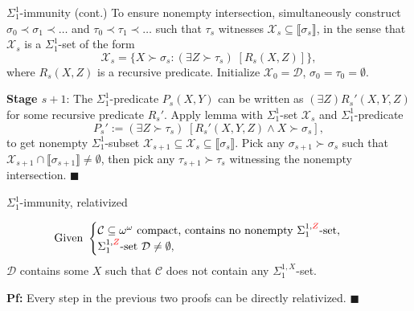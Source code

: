 \begin{frame}{$\Sigma_1^{1}$-immunity (cont.)}
  To ensure nonempty intersection, simultaneously construct
  $\sigma_0\prec\sigma_1\prec\ldots$ and $\tau_0\prec\tau_1\prec\ldots$
  such that $\tau_s$ witnesses $\mathcal{X}_s \subseteq
  \llbracket\sigma_s\rrbracket$, in the sense that $\mathcal{X}_s$ is a
  $\Sigma^1_1$-set of the form
  \[\mathcal{X}_s =\{X\succ\sigma_s: (\exists Z\succ\tau_s)\;
  [R_s(X,Z)]\},\]
  where $R_s(X,Z)$ is a recursive predicate. Initialize
  $\mathcal{X}_0=\mathcal{D}$, $\sigma_0=\tau_0=\emptyset$.

  \vspace{0.5em}
  \textbf{Stage $s+1$}: The $\Sigma^1_1$-predicate $P_s(X,Y)$ can be
  written as $(\exists Z) R_s'(X,Y,Z)$ for some recursive predicate $R_s'$.
  Apply lemma with $\Sigma^1_1$-set $\mathcal{X}_s$ and
  $\Sigma^1_1$-predicate 
  \[P_s' :=(\exists Z\succ\tau_s)\; [R_s'(X,Y,Z) \wedge X\succ\sigma_s],\]
  to get nonempty $\Sigma^1_1$-subset $\mathcal{X}_{s+1} \subseteq
  \mathcal{X}_s \subseteq \llbracket\sigma_s\rrbracket$. Pick any
  $\sigma_{s+1}\succ\sigma_s$ such that $\mathcal{X}_{s+1}\cap
  \llbracket\sigma_{s+1}\rrbracket \neq\emptyset$, then pick any
  $\tau_{s+1}\succ\tau_s$ witnessing the nonempty intersection.
  $\blacksquare$
\end{frame}

\begin{frame}{$\Sigma_1^{1}$-immunity, relativized}
  \begin{coro*}
    \begin{align*}
      \text{Given } &\begin{cases}
        \mathcal{C}\subseteq\omega^\omega \text{ compact, contains
        no nonempty } \Sigma^{1,\textcolor{red}{Z}}_{1}\text{-set},\\
        \Sigma^{1,\textcolor{red}{Z}}_{1}\text{-set }
        \mathcal{D}\neq\emptyset,
      \end{cases}
    \end{align*}
    $\mathcal{D}$ contains some $X$ such that $\mathcal{C}$ does not
    contain any $\Sigma_1^{1,X}$-set.
  \end{coro*}

  \vspace{2em}
  \textbf{Pf:} Every step in the previous two proofs can be directly
  relativized.
  $\blacksquare$
\end{frame}
